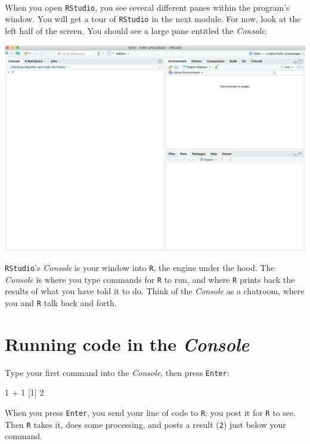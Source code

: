 \documentclass[
]{book}
\newenvironment{Shaded}{\begin{snugshade}}{\end{snugshade}}
\newcommand{\DecValTok}[1]{\textcolor[rgb]{0.00,0.00,0.81}{#1}}
\newcommand{\NormalTok}[1]{#1}
\newcommand{\SpecialCharTok}[1]{\textcolor[rgb]{0.00,0.00,0.00}{#1}}
\begin{document}
~

When you open \texttt{RStudio}, you see several different panes within the program's window. You will get a tour of \texttt{RStudio} in the next module. For now, look at the left half of the screen. You should see a large pane entitled the \emph{Console}.

\includegraphics{img/rstudio_firstopen.png}

\texttt{RStudio}'s \emph{Console} is your window into \texttt{R}, the engine under the hood. The \emph{Console} is where you type commands for \texttt{R} to run, and where \texttt{R} prints back the results of what you have told it to do. Think of the \emph{Console} as a chatroom, where you and \texttt{R} talk back and forth.

\hypertarget{running-code-in-the-console}{%
\section*{\texorpdfstring{Running code in the \emph{Console}}{Running code in the Console}}\label{running-code-in-the-console}}

Type your first command into the \emph{Console}, then press \texttt{Enter}:

\begin{Shaded}
\begin{Highlighting}[]
\DecValTok{1} \SpecialCharTok{+} \DecValTok{1}
\NormalTok{[}\DecValTok{1}\NormalTok{] }\DecValTok{2}
\end{Highlighting}
\end{Shaded}

When you press \texttt{Enter}, you send your line of code to \texttt{R}; you post it for \texttt{R} to see. Then \texttt{R} takes it, does some processing, and posts a result (\texttt{2}) just below your command.
\end{document}
